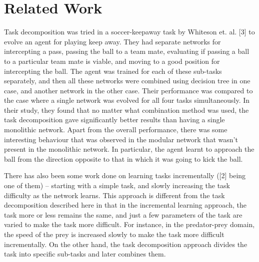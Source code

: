 \section{Related Work}
\label{relatedwork}
Task decomposition was tried in a soccer-keepaway task by Whiteson et. al. [3] to evolve an agent for playing keep away. They had separate networks for intercepting a pass, passing the ball to a team mate, evaluating if passing a ball to a particular team mate is viable, and moving to a good position for intercepting the ball. The agent was trained for each of these sub-tasks separately, and then all these networks were combined using decision tree in one case, and another network in the other case. Their performance was compared to the case where a single network was evolved for all four tasks simultaneously. In their study, they found that no matter what combination method was used, the task decomposition gave significantly better results than having a single monolithic network.  Apart from the overall performance, there was some interesting behaviour that was observed in the modular network that wasn’t present in the monolithic network. In particular, the agent learnt to approach the ball from the direction opposite to that in which it was going to kick the ball.

There has also been some work done on learning tasks incrementally ([2] being one of them) -- starting with a simple task, and slowly increasing the task difficulty as the network learns. This approach is different from the task decomposition described here in that in the incremental learning approach, the task more or less remains the same, and just a few parameters of the task are varied to make the task more difficult. For instance, in the predator-prey domain, the speed of the prey is increased slowly to make the task more difficult incrementally. On the other hand, the task decomposition approach divides the task into specific sub-tasks and later combines them.
